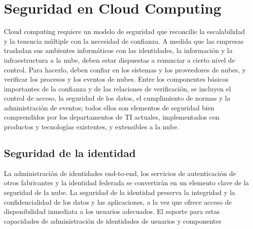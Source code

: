 \documentclass[12pt,a4paper]{article}
\begin{document}
\section{Seguridad en Cloud Computing}
Cloud computing requiere un modelo de
seguridad que reconcilie la escalabilidad y la tenencia
múltiple con la necesidad de confianza. A medida que las
empresas trasladan sus ambientes informáticos con las
identidades, la información y la infraestructura a la nube,
deben estar dispuestas a renunciar a cierto nivel de control.
Para hacerlo, deben confiar en los sistemas y los
proveedores de nubes, y verificar los procesos y los eventos
de nubes. Entre los componentes básicos importantes de la
confianza y de las relaciones de verificación, se incluyen el
control de acceso, la seguridad de los datos, el
cumplimiento de normas y la administración de eventos;
todos ellos son elementos de seguridad bien comprendidos
por los departamentos de TI actuales, implementados con
productos y tecnologías existentes, y extensibles a la nube.

\subsection{Seguridad de la identidad}
La administración de identidades end-to-end, los servicios
de autenticación de otros fabricantes y la identidad federada
se convertirán en un elemento clave de la seguridad de la
nube. La seguridad de la identidad preserva la integridad y la
confidencialidad de los datos y las aplicaciones, a la vez que
ofrece acceso de disponibilidad inmediata a los usuarios
adecuados. El soporte para estas capacidades de
administración de identidades de usuarios y componentes
\end{document}
